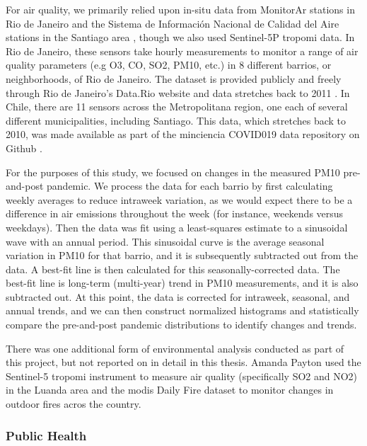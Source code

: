 For air quality, we primarily relied upon in-situ data from MonitorAr stations in Rio de Janeiro  and the Sistema de Información Nacional de Calidad del Aire stations in the Santiago area , though we also used Sentinel-5P \ac{tropomi} data. In Rio de Janeiro, these sensors take hourly measurements to monitor a range of air quality parameters (e.g O3, CO, SO2, PM10, etc.) in 8 different barrios, or neighborhoods, of Rio de Janeiro. The dataset is provided publicly and freely through Rio de Janeiro's Data.Rio website and data stretches back to 2011 \cite{institutopereirapassosDadosHorariosMonitoramento2018}. In Chile, there are  11 sensors across the Metropolitana region, one each of several different municipalities, including Santiago. This data, which stretches back to 2010, was made available as part of the \ac{minciencia} COVID019 data repository on Github \cite{ministeriodecienciatecnologiaconocimientoeinnovacionDatosCOVID192021}.

For the purposes of this study, we focused on changes in the measured PM10 pre-and-post pandemic. We process the data for each barrio by first calculating weekly averages to reduce intraweek variation, as we would expect there to be a difference in air emissions throughout the week (for instance, weekends versus weekdays). Then the data was fit using a least-squares estimate to a sinusoidal wave with an annual period. This sinusoidal curve is the average seasonal variation in PM10 for that barrio, and it is subsequently subtracted out from the data. A best-fit line is then calculated for this seasonally-corrected data. The best-fit line is long-term (multi-year) trend in PM10 measurements, and it is also subtracted out. At this point, the data is corrected for intraweek, seasonal, and annual trends, and we can then construct normalized histograms and statistically compare the pre-and-post pandemic distributions to identify changes and trends. 

There was one additional form of environmental analysis conducted as part of this project, but not reported on in detail in this thesis. Amanda Payton used the Sentinel-5 \ac{tropomi} instrument to measure air quality (specifically SO2 and NO2) in the Luanda area and the \ac{modis} Daily Fire dataset to monitor changes in outdoor fires acros the country.

\subsubsection{Public Health}

